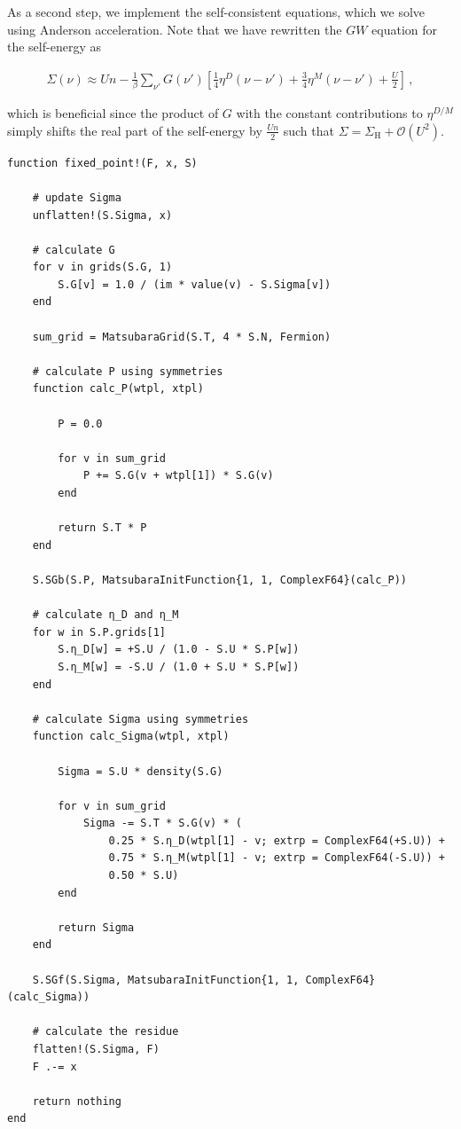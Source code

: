 \documentclass{SciPost}
\begin{document}
%
As a second step, we implement the self-consistent equations, which we solve using Anderson acceleration. Note that we have rewritten the $GW$ equation for the self-energy as 
%
\begin{linenomath}
    \begin{align}
        \Sigma(\nu) \approx Un - \tfrac{1}{\beta} \sum_{\nu'} G(\nu') \left[ \tfrac{1}{4} \eta^{D}(\nu - \nu') + \tfrac{3}{4} \eta^{M}(\nu - \nu') + \tfrac{U}{2} \right] \,,
    \end{align}
\end{linenomath}
%
which is beneficial since the product of $G$ with the constant contributions to $\eta^{D/M}$ simply shifts the real part of the self-energy by $\tfrac{Un}{2}$ such that $\Sigma = \Sigma_{\text{H}} + \mathcal{O}(U^2)$.
%
\begin{verbatim}
function fixed_point!(F, x, S)
    
    # update Sigma 
    unflatten!(S.Sigma, x)

    # calculate G
    for v in grids(S.G, 1)
        S.G[v] = 1.0 / (im * value(v) - S.Sigma[v])
    end

    sum_grid = MatsubaraGrid(S.T, 4 * S.N, Fermion)

    # calculate P using symmetries
    function calc_P(wtpl, xtpl)

        P = 0.0 

        for v in sum_grid 
            P += S.G(v + wtpl[1]) * S.G(v)
        end
        
        return S.T * P
    end 
    
    S.SGb(S.P, MatsubaraInitFunction{1, 1, ComplexF64}(calc_P))

    # calculate η_D and η_M
    for w in S.P.grids[1] 
        S.η_D[w] = +S.U / (1.0 - S.U * S.P[w])
        S.η_M[w] = -S.U / (1.0 + S.U * S.P[w])
    end 

    # calculate Sigma using symmetries
    function calc_Sigma(wtpl, xtpl)

        Sigma = S.U * density(S.G)

        for v in sum_grid
            Sigma -= S.T * S.G(v) * (
                0.25 * S.η_D(wtpl[1] - v; extrp = ComplexF64(+S.U)) + 
                0.75 * S.η_M(wtpl[1] - v; extrp = ComplexF64(-S.U)) + 
                0.50 * S.U)
        end
        
        return Sigma
    end 

    S.SGf(S.Sigma, MatsubaraInitFunction{1, 1, ComplexF64}(calc_Sigma))

    # calculate the residue
    flatten!(S.Sigma, F)
    F .-= x
    
    return nothing
end
\end{verbatim}
\end{document}
